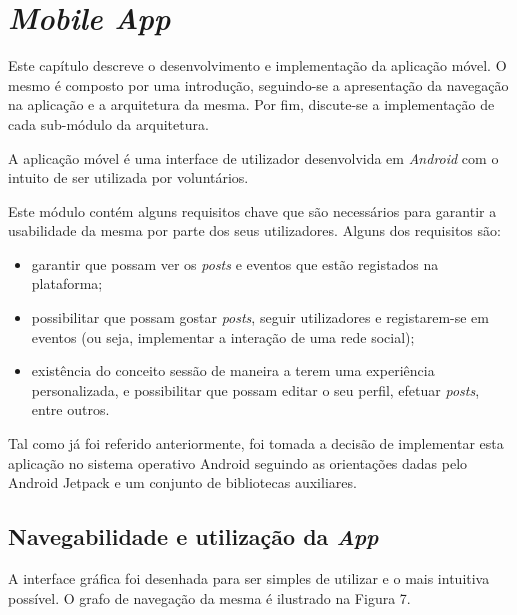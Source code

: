 \section{\textit{Mobile App}}

Este capítulo descreve o desenvolvimento e implementação da aplicação móvel. O mesmo é composto por uma introdução, seguindo-se a apresentação da navegação na aplicação e a arquitetura da mesma. Por fim, discute-se a implementação de cada sub-módulo da arquitetura.

\bigskip \bigskip

A aplicação móvel é uma interface de utilizador desenvolvida em \textit{Android} com o intuito de ser utilizada por voluntários.

\par \bigskip \bigskip

Este módulo contém alguns requisitos chave que são necessários para garantir a usabilidade da mesma por parte dos seus utilizadores. Alguns dos requisitos são:

\begin{itemize}
	\item garantir que possam ver os \textit{posts} e eventos que estão registados na plataforma;
	\item possibilitar que possam gostar \textit{posts}, seguir utilizadores e registarem-se em eventos (ou seja, implementar a interação de uma rede social);
	\item existência do conceito sessão de maneira a terem uma experiência personalizada, e possibilitar que possam editar o seu perfil, efetuar \textit{posts}, entre outros.
\end{itemize}

\bigskip

Tal como já foi referido anteriormente, foi tomada a decisão de implementar esta aplicação no sistema operativo Android seguindo as orientações dadas pelo Android Jetpack e um conjunto de bibliotecas auxiliares.

\bigskip \bigskip

\subsection{Navegabilidade e utilização da \textit{App}}

\bigskip

A interface gráfica foi desenhada para ser simples de utilizar e o mais intuitiva possível. O grafo de navegação da mesma é ilustrado na Figura 7.

